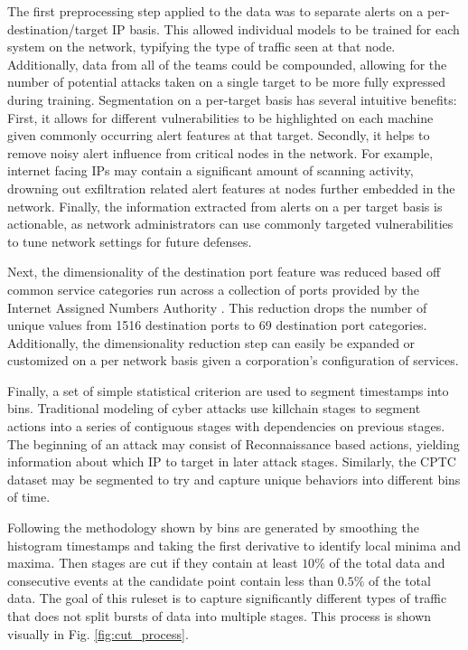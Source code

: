 The first preprocessing step applied to the data was to separate alerts on a per-destination/target IP basis. This allowed individual models to be trained for each system on the network, typifying the type of traffic seen at that node. Additionally, data from all of the teams could be compounded, allowing for the number of potential attacks taken on a single target to be more fully expressed during training. Segmentation on a per-target basis has several intuitive benefits: First, it allows for different vulnerabilities to be highlighted on each machine given commonly occurring alert features at that target. Secondly, it helps to remove noisy alert influence from critical nodes in the network. For example, internet facing IPs may contain a significant amount of scanning activity, drowning out exfiltration related alert features at nodes further embedded in the network. Finally, the information extracted from alerts on a per target basis is actionable, as network administrators can use commonly targeted vulnerabilities to tune network settings for future defenses. 


Next, the dimensionality of the destination port feature was reduced based off common service categories run across a collection of ports provided by the Internet Assigned Numbers Authority \cite{iana}. This reduction drops the number of unique values from 1516 destination ports to 69 destination port categories. Additionally, the dimensionality reduction step can easily be expanded or customized on a per network basis given a corporation's configuration of services. 



Finally, a set of simple statistical criterion are used to segment timestamps into bins. Traditional modeling of cyber attacks use killchain stages to segment actions into a series of contiguous stages with dependencies on previous stages. The beginning of an attack may consist of Reconnaissance based actions, yielding information about which IP to target in later attack stages. Similarly, the CPTC dataset may be segmented to try and capture unique behaviors into different bins of time. 

Following the methodology shown by \cite{us} bins are generated by smoothing the histogram timestamps and taking the first derivative to identify local minima and maxima. Then stages are cut if they contain at least $10\%$ of the total data and consecutive events at the candidate point contain less than $0.5\%$ of the total data. The goal of this ruleset is to capture significantly different types of traffic that does not split bursts of data into multiple stages. This process is shown visually in Fig. \ref{fig:cut_process}.

